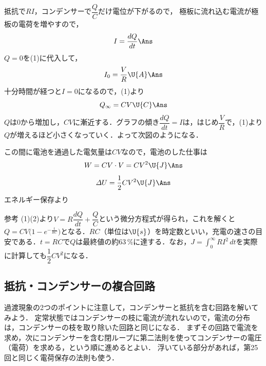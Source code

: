 \begin{reidaiunit}
\begin{kaitou}
\begin{komon}
 抵抗で$RI$，コンデンサーで$\dfrac{Q}{C}$だけ電位が下がるので，
 極板に流れ込む電流が極板の電荷を増やすので，
       \[I=\frac{dQ}{dt}\Ans\]
 $Q=0$を(1)に代入して，
       \[I_0=\frac{V}{R}\U{A}\Ans\]
 十分時間が経つと$I=0$になるので，(1)より
       \[Q_\infty=CV\U{C}\Ans\]
 $Q$は$0$から増加し，$CV$に漸近する．グラフの傾き$\dfrac{dQ}{dt}=I$は，はじめ$\dfrac{V}{R}$で，(1)より$Q$が増えるほど小さくなっていく．よって次図のようになる．\Ans
       \begin{center}\end{center}
 この間に電池を通過した電気量は$CV$なので，電池のした仕事は
       \[W=CV\cdot V=CV^2\U{J}\Ans\]
       \[\varDelta U=\frac{1}{2}CV^2\U{J}\Ans\]
       エネルギー保存より
       \begin{bsHosoku}{参考}
       (1)(2)より$V=R\dfrac{dQ}{dt}+\dfrac{Q}{C}$という微分方程式が得られ，これを解くと$Q=CV\bigl(1-e^{-\frac{t}{RC}}\bigr)$となる．$RC$（単位は$\U{s}$）を{\gtfamily 時定数}といい，充電の速さの目安である．$t=RC$で$Q$は最終値の約$63\,\%$に達する．なお，$J=\displaystyle\int_0^\infty RI^2\,dt$を実際に計算しても$\dfrac{1}{2}CV^2$になる．
       \end{bsHosoku}
\end{komon}
\end{kaitou}
\end{reidaiunit}

\subsection{抵抗・コンデンサーの複合回路}

過渡現象の2つのポイントに注意して，コンデンサーと抵抗を含む回路を解いてみよう．
定常状態ではコンデンサーの枝に電流が流れないので，{\gtfamily 電流の分布は，コンデンサーの枝を取り除いた回路と同じになる}．
まずその回路で電流を求め，次にコンデンサーを含む閉ループに第二法則を使ってコンデンサーの電圧（電荷）を求める，という順に進めるとよい．
浮いている部分があれば，第25回と同じく電荷保存の法則も使う．

